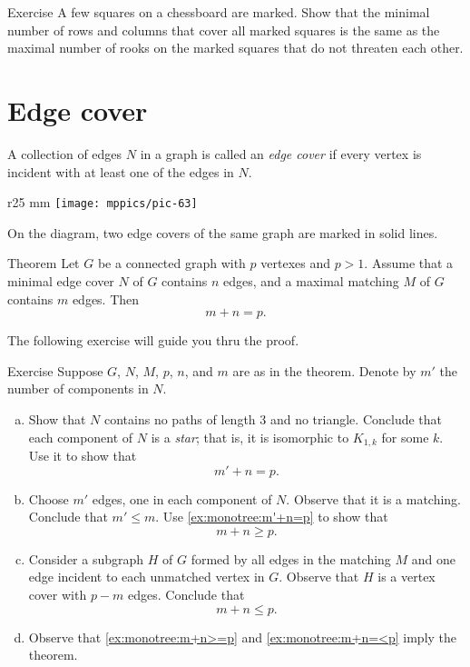 \begin{thm}{Exercise}
A few squares
 on a chessboard are marked.
Show that the minimal number of rows and columns that cover all marked squares is the same as the maximal number of rooks on the marked squares that do not threaten each other.
\end{thm}

\section*{Edge cover}

A collection of edges $N$ in a graph is called an \emph{edge cover} if every vertex is incident with at least one of the edges in $N$.

\begin{wrapfigure}{r}{25 mm}
\vskip-2mm
\centering
\texttt{[image: mppics/pic-63]}
\vskip0mm
\end{wrapfigure}

On the diagram, two edge covers of the same graph are marked in solid lines.

\begin{thm}{Theorem}
Let $G$ be a connected graph with $p$ vertexes and $p>1$.
Assume that a minimal edge cover $N$ of $G$ contains $n$ edges, and a maximal matching $M$ of $G$ contains $m$ edges.
Then
\[m+n=p.\]
\end{thm}

The following exercise will guide you thru the proof.


\begin{thm}{Exercise}\label{ex:monotree}
Suppose $G$, $N$, $M$, $p$, $n$, and $m$ are as in the theorem.
Denote by $m'$ the number of components in $N$.
\begin{enumerate}[(a)]
\item\label{ex:monotree:m'+n=p} Show that $N$ contains no paths of length 3 and no triangle.
Conclude that each component of $N$ is a \emph{star};
that is, it is isomorphic to $K_{1,k}$ for some $k$.
Use it to show that 
\[m'+n=p.\]
\item\label{ex:monotree:m+n>=p} Choose $m'$ edges, one in each component of $N$.
Observe that it is a matching.
Conclude that $m'\le m$.
Use \ref{ex:monotree:m'+n=p} to show that 
\[m+n\ge p.\]
\item\label{ex:monotree:m+n=<p} Consider a subgraph $H$ of $G$ formed by all edges in the matching $M$ and one edge incident to each unmatched vertex in $G$.
Observe that $H$ is a vertex cover with $p-m$ edges. 
Conclude that 
\[m+n\le p.\]
\item Observe that \ref{ex:monotree:m+n>=p} and \ref{ex:monotree:m+n=<p} imply the theorem.
\end{enumerate}

\end{thm}


